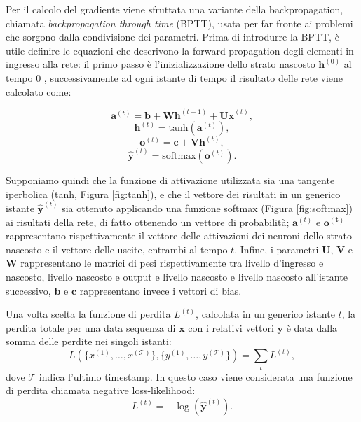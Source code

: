 \documentclass[../../main.tex]{subfiles}
\begin{document}
Per il calcolo del gradiente viene sfruttata una variante della  backpropagation, chiamata \textit{backpropagation through time} (BPTT), usata per far fronte ai problemi che sorgono dalla condivisione dei parametri. Prima di introdurre la BPTT, è utile definire le equazioni che descrivono la forward propagation degli elementi in ingresso alla rete: il primo passo è l'inizializzazione dello strato nascosto $\boldsymbol{h}^{(0)}$ al tempo 0 , successivamente ad ogni istante di tempo il risultato delle rete viene calcolato come:
\begin{fleqn}[1cm]
    \begin{equation}
        \boldsymbol{a}^{(t)} = \boldsymbol{b} + \boldsymbol{W h}^{(t-1)} + \boldsymbol{U x}^{(t)},
    \end{equation}
    \begin{equation}
        \boldsymbol{h}^{(t)} = \mathrm{tanh}(\boldsymbol{a}^{(t)}),
    \end{equation}
    \begin{equation}
        \boldsymbol{o}^{(t)} = \boldsymbol{c} + \boldsymbol{V h}^{(t)},
    \end{equation}
    \begin{equation}
        \boldsymbol{\hat{y}}^{(t)} = \mathrm{softmax}(\boldsymbol{o}^{(t)}).
    \end{equation}
\end{fleqn}
Supponiamo quindi che la funzione di attivazione utilizzata sia una tangente iperbolica (tanh, Figura \ref{fig:tanh}), e che il vettore dei risultati in un generico istante $\boldsymbol{\hat{y}}^{(t)}$ sia ottenuto applicando una funzione softmax (Figura \ref{fig:softmax}) ai risultati della rete, di fatto ottenendo un vettore di probabilità; $\boldsymbol{a}^{(t)}$ e $\boldsymbol{o^{(t)}}$ rappresentano rispettivamente il vettore delle attivazioni dei neuroni dello strato nascosto e il vettore delle uscite, entrambi al tempo $t$. Infine, i parametri $\boldsymbol{U}$, $\boldsymbol{V}$ e $\boldsymbol{W}$ rappresentano le matrici di pesi rispettivamente tra livello d'ingresso e nascosto, livello nascosto e output e livello nascosto e livello nascosto all'istante successivo, $\boldsymbol{b}$ e $\boldsymbol{c}$ rappresentano invece i vettori di bias.

Una volta scelta la funzione di perdita $L^{(t)}$, calcolata in un generico istante $t$, la perdita totale per una data sequenza di $\boldsymbol{x}$ con i relativi vettori $\boldsymbol{y}$ è data dalla somma delle perdite nei singoli istanti:
\[L(\{x^{(1)}, \dots, x^{(\mathcal{T})}\}, \{y^{(1)}, \dots, y^{(\mathcal{T})}\}) = \sum_t L^{(t)},\]
dove $\mathcal{T}$ indica l'ultimo timestamp. In questo caso viene considerata una funzione di perdita chiamata negative loss-likelihood: 
\[L^{(t)} = -\log\left(\boldsymbol{\hat{y}}^{(t)}\right).\]
\end{document}
